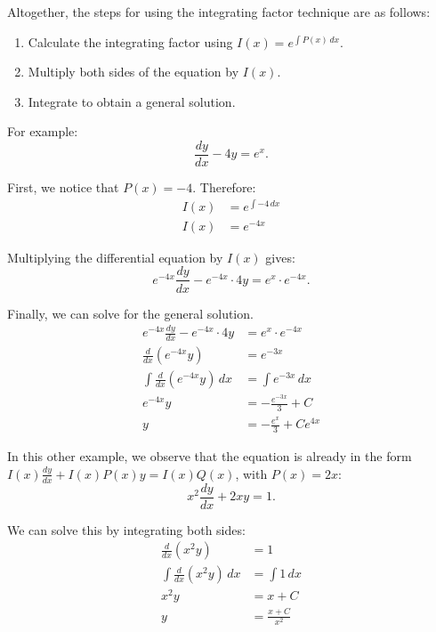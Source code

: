 \documentclass[12pt]{article}
\begin{document}
Altogether, the steps for using the integrating factor technique are as follows:
\begin{enumerate}
    \item Calculate the integrating factor using $I(x) = e^{\int P(x) \, dx}$.
    \item Multiply both sides of the equation by $I(x)$.
    \item Integrate to obtain a general solution.
\end{enumerate}

For example:
\[ \frac{dy}{dx} - 4y = e^x. \]

First, we notice that $P(x) = -4$. Therefore:
\begin{align*}
    I(x) & = e^{\int -4 \, dx} \\
    I(x) & = e^{-4x}
\end{align*}

Multiplying the differential equation by $I(x)$ gives:
\[ e^{-4x} \frac{dy}{dx} - e^{-4x} \cdot 4y = e^x \cdot e^{-4x}. \]

Finally, we can solve for the general solution.
\begin{align*}
    e^{-4x} \frac{dy}{dx} - e^{-4x} \cdot 4y        & = e^x \cdot e^{-4x}         \\[6pt]
    \frac{d}{dx} \left( e^{-4x}y \right)            & = e^{-3x}                   \\[6pt]
    \int \frac{d}{dx} \left( e^{-4x}y \right) \, dx & = \int e^{-3x} \, dx        \\[6pt]
    e^{-4x}y                                        & = -\frac{e^{-3x}}{3} + C    \\[6pt]
    y                                               & = -\frac{e^x}{3} + C e^{4x}
\end{align*}

In this other example, we observe that the equation is already in the form $I(x) \frac{dy}{dx} + I(x) P(x)y = I(x) Q(x)$, with $P(x) = 2x$:
\[ x^2 \frac{dy}{dx} + 2xy = 1. \]

We can solve this by integrating both sides:
\begin{align*}
    \frac{d}{dx} \left( x^2 y \right)            & = 1                 \\[6pt]
    \int \frac{d}{dx} \left( x^2 y \right) \, dx & = \int 1 \, dx      \\[6pt]
    x^2 y                                        & = x + C             \\
    y                                            & = \frac{x + C}{x^2}
\end{align*}
\end{document}
